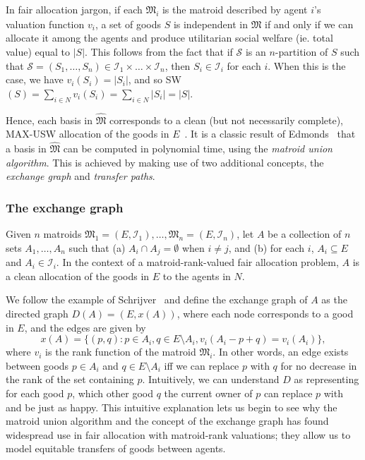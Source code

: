 In fair allocation jargon, if each $\mathfrak{M}_i$ is the matroid described by agent $i$'s valuation function $v_i$, a set of goods $S$ is independent in $\widehat{\mathfrak{M}}$ if and only if we can allocate it among the agents and produce utilitarian social welfare (ie. total value) equal to $|S|$. This follows from the fact that if $\mathcal{S}$ is an $n$-partition of $S$ such that $\mathcal{S} = (S_1,\dots,S_n)\in\mathcal{I}_1\times\dots\times\mathcal{I}_n$, then $S_i\in\mathcal{I}_i$ for each $i$. When this is the case, we have $v_i(S_i) = |S_i|$, and so SW$(S) = \sum_{i\in N}v_i(S_i) = \sum_{i\in N}|S_i| = |S|$.

Hence, each basis in $\widehat{\mathfrak{M}}$ corresponds to a clean (but not necessarily complete), MAX-USW allocation of the goods in $E$~\cite{barman2021existence}. It is a classic result of Edmonds~\cite{Edmonds2009} that a basis in $\widehat{\mathfrak{M}}$ can be computed in polynomial time, using the \textit{matroid union algorithm}. This is achieved by making use of two additional concepts, the \textit{exchange graph} and \textit{transfer paths}. 

\subsubsection*{The exchange graph}
Given $n$ matroids $\mathfrak{M}_1 = (E, \mathcal{I}_1),\ldots,\mathfrak{M}_n = (E,\mathcal{I}_n)$, let $A$ be a collection of $n$ sets $A_1,\dots,A_n$ such that (a) $A_i\cap A_j = \emptyset$ when $i\neq j$, and (b) for each $i$, $A_i\subseteq E$ and $A_i\in\mathcal{I}_i$. In the context of a matroid-rank-valued fair allocation problem, $A$ is a clean allocation of the goods in $E$ to the agents in $N$.

We follow the example of Schrijver~\cite{schrijver-2003} and define the exchange graph of $A$ as the directed graph $D(A)=(E, x(A))$, where each node corresponds to a good in $E$, and the edges are given by
$$x(A) = \{ (p,q) : p \in A_i, q \in E\setminus A_i, v_i(A_i - p + q) = v_i(A_i) \},$$
where $v_i$ is the rank function of the matroid $\mathfrak{M}_i$. In other words, an edge exists between goods $p\in A_i$ and $q\in E\setminus A_i$ iff we can replace $p$ with $q$ for no decrease in the rank of the set containing $p$. Intuitively, we can understand $D$ as representing for each good $p$, which other good $q$ the current owner of $p$ can replace $p$ with and be just as happy. This intuitive explanation lets us begin to see why the matroid union algorithm and the concept of the exchange graph has found widespread use in fair allocation with matroid-rank valuations; they allow us to model equitable transfers of goods between agents.


